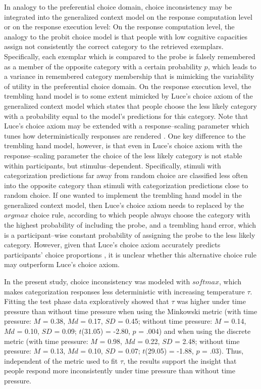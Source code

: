 \documentclass[a4paper,man,natbib]{apa6}
\begin{document}
In analogy to the preferential choice domain, choice inconsistency may be integrated into the generalized context model on the response computation level or on the response execution level: On the response computation level, the analogy to the probit choice model is that people with low cognitive capacities assign not consistently the correct category to the retrieved exemplars. Specifically, each exemplar which is compared to the probe is falsely remembered as a member of the opposite category with a certain probability $p$, which leads to a variance in remembered category membership that is mimicking the variability of utility in the preferential choice domain. On the response execution level, the trembling hand model is to some extent mimicked by Luce's choice axiom of the generalized context model which states that people choose the less likely category with a probability equal to the model's predictions for this category. Note that Luce's choice axiom may be extended with a response--scaling parameter which tunes how deterministically responses are rendered \citep{nosofsky2002exemplar, nosofsky2011generalized, ashby1993relations}. One key difference to the trembling hand model, however, is that even in Luce's choice axiom with the response--scaling parameter the choice of the less likely category is not stable within participants, but stimulus--dependent. Specifically, stimuli with categorization predictions far away from random choice are classified less often into the opposite category than stimuli with categorization predictions close to random choice. If one wanted to implement the trembling hand model in the generalized context model, then Luce's choice axiom needs to replaced by the $argmax$ choice rule, according to which people always choose the category with the highest probability of including the probe, and a trembling hand error, which is a participant--wise constant probability of assigning the probe to the less likely category. However, given that Luce's choice axiom accurately predicts participants' choice proportions \citep{nosofsky1987attention, mckinley1995investigations, lamberts2000information}, it is unclear whether this alternative choice rule may outperform Luce's choice axiom. 

In the present study, choice inconsistency was modeled with $softmax$, which makes categorization responses less deterministic with increasing temperature $\tau$. Fitting the test phase data exploratively showed that $\tau$ was higher under time pressure than without time pressure when using the Minkowski metric (with time pressure: $M$ = 0.38, $Md$ = 0.17, $SD$ = 0.45; without time pressure: $M$ = 0.14, $Md$ = 0.10, $SD$ = 0.09; $t$(31.05) = -2.80, $p$ = .004) and when using the discrete metric (with time pressure: $M$ = 0.98, $Md$ = 0.22, $SD$ = 2.48; without time pressure: $M$ = 0.13, $Md$ = 0.10, $SD$ = 0.07; $t$(29.05) = -1.88, $p$ = .03). Thus, independent of the metric used to fit $\tau$, the results support the insight that people respond more inconsistently under time pressure than without time pressure.
\end{document}
